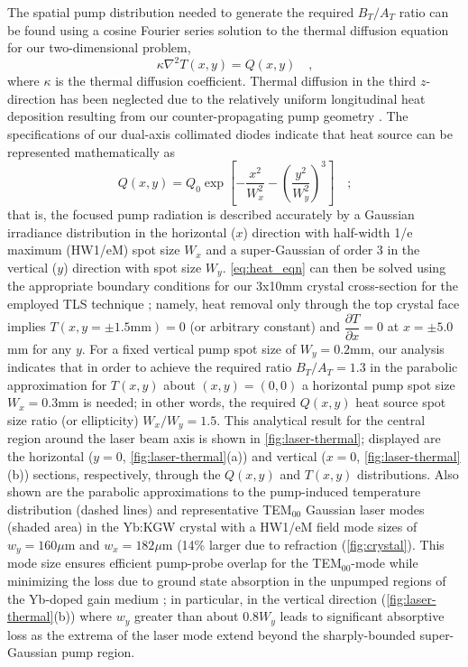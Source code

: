 The spatial pump distribution needed to generate the required $B_T/A_T$ ratio can be found using a cosine Fourier series solution to the thermal diffusion equation for our two-dimensional problem,
\begin{equation} \label{eq:heat_eqn}
  \kappa \nabla^2 T(x,y) = Q(x,y)
  \quad\text{,}
\end{equation}
where $\kappa$ is the thermal diffusion coefficient.
Thermal diffusion in the third $z$-direction has been neglected due to the relatively uniform longitudinal heat deposition resulting from our counter-propagating pump geometry \cite{Rimington_thermal_lens_2004}.
The specifications of our dual-axis collimated diodes \cite{website_limo} indicate that heat source can be represented mathematically as
\begin{equation}
  Q(x,y) = Q_0 \exp \left[ - \frac{x^2}{W_x^2} - \left( \frac{y^2}{W_y^2} \right)^3 \right]
  \quad\text{;}
\end{equation}
that is, the focused pump radiation is described accurately by a Gaussian irradiance distribution in the horizontal ($x$) direction with half-width 1/e maximum (HW1/eM) spot size $W_x$ and a super-Gaussian of order 3 in the vertical ($y$) direction with spot size $W_y$.
\ref{eq:heat_eqn} can then be solved using the appropriate boundary conditions for our 3x10mm crystal cross-section for the employed TLS technique \cite{Rimington_thermal_lens_2004}; namely, heat removal only through the top crystal face implies $T(x,y = \pm 1.5\text{mm}) = 0$ (or arbitrary constant) and $\dfrac{\partial T}{\partial x} = 0$ at $ x = \pm 5.0$mm for any $y$.
For a fixed vertical pump spot size of $W_y = 0.2$mm, our analysis indicates that in order to achieve the required ratio $B_T / A_T = 1.3$ in the parabolic approximation for $T(x,y)$ about $(x,y) = (0,0)$ a horizontal pump spot size $W_x = 0.3$mm is needed; in other words, the required $Q(x,y)$ heat source spot size ratio (or ellipticity) $W_x / W_y = 1.5$.
This analytical result for the central region around the laser beam axis is shown in \ref{fig:laser-thermal}; displayed are the
horizontal ($y = 0$, \ref{fig:laser-thermal}(a)) and vertical ($x = 0$, \ref{fig:laser-thermal}(b)) sections, respectively, through the $Q(x,y)$ and $T(x,y)$ distributions.
Also shown are the parabolic approximations to the pump-induced temperature distribution (dashed lines) and representative TEM$_{00}$ Gaussian laser modes (shaded area) in the Yb:KGW crystal with a HW1/eM field mode sizes of $w_y = 160\mu$m and $w_x = 182 \mu$m (14\% larger due to refraction (\ref{fig:crystal}).
This mode size ensures efficient pump-probe overlap for the TEM$_{00}$-mode while minimizing the loss due to ground state absorption in the unpumped regions of the Yb-doped gain medium \cite{Brenier_new_criteria}; in particular, in the vertical direction (\ref{fig:laser-thermal}(b)) where $w_y$ greater than about $0.8 W_y$ leads to significant absorptive loss as the extrema of the laser mode extend beyond the sharply-bounded super-Gaussian pump region.

